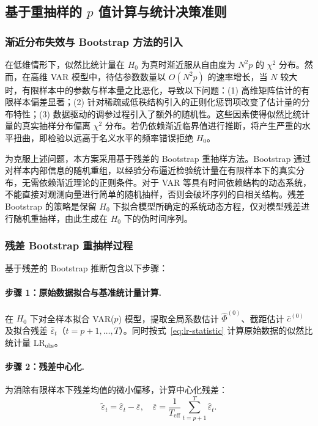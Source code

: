 \subsection{基于重抽样的 $p$ 值计算与统计决策准则}\label{subsec:bootstrap}

\subsubsection{渐近分布失效与 Bootstrap 方法的引入}

在低维情形下，似然比统计量在 $H_0$ 为真时渐近服从自由度为 $N^2 p$ 的 $\chi^2$ 分布。然而，在高维 VAR 模型中，待估参数数量以 $O(N^2 p)$ 的速率增长，当 $N$ 较大时，有限样本中的参数与样本量之比恶化，导致以下问题：(1) 高维矩阵估计的有限样本偏差显著；(2) 针对稀疏或低秩结构引入的正则化惩罚项改变了估计量的分布特性；(3) 数据驱动的调参过程引入了额外的随机性。这些因素使得似然比统计量的真实抽样分布偏离 $\chi^2$ 分布。若仍依赖渐近临界值进行推断，将产生严重的水平扭曲，即检验以远高于名义水平的频率错误拒绝 $H_0$。

为克服上述问题，本方案采用基于残差的 Bootstrap 重抽样方法。Bootstrap 通过对样本内部信息的随机重组，以经验分布逼近检验统计量在有限样本下的真实分布，无需依赖渐近理论的正则条件。对于 VAR 等具有时间依赖结构的动态系统，不能直接对观测向量进行简单的随机抽样，否则会破坏序列的自相关结构。残差 Bootstrap 的策略是保留 $H_0$ 下拟合模型所确定的系统动态方程，仅对模型残差进行随机重抽样，由此生成在 $H_0$ 下的伪时间序列。

\subsubsection{残差 Bootstrap 重抽样过程}

基于残差的 Bootstrap 推断包含以下步骤：

\paragraph{步骤 1：原始数据拟合与基准统计量计算.}
在 $H_0$ 下对全样本拟合 VAR($p$) 模型，提取全局系数估计 $\hat{\Phi}^{(0)}$、截距估计 $\hat{c}^{(0)}$ 及拟合残差 $\hat{\varepsilon}_t$（$t = p+1, \ldots, T$）。同时按式~\eqref{eq:lr-statistic} 计算原始数据的似然比统计量 $\mathrm{LR}_{\text{obs}}$。

\paragraph{步骤 2：残差中心化.}
为消除有限样本下残差均值的微小偏移，计算中心化残差：
\begin{equation}\label{eq:center-resid}
    \tilde{\varepsilon}_t = \hat{\varepsilon}_t - \bar{\varepsilon}, \quad \bar{\varepsilon} = \frac{1}{T_{\text{eff}}} \sum_{t=p+1}^{T} \hat{\varepsilon}_t.
\end{equation}


